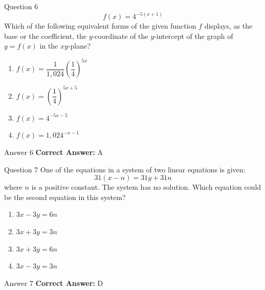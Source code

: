 \documentclass{beamer}
\begin{document}
\begin{frame}{Question 6}
\small
\[
f(x)=4^{-5(x+1)}
\]
Which of the following equivalent forms of the given function \(f\) displays, as the base or the coefficient, the \(y\)-coordinate of the \(y\)-intercept of the graph of \(y=f(x)\) in the \(xy\)-plane?
\vspace{0.35cm}
\begin{enumerate}
    \item[A.] $f(x)=\dfrac{1}{1{,}024}\left(\dfrac{1}{4}\right)^{5x}$
    \item[B.] $f(x)=\left(\dfrac{1}{4}\right)^{5x+5}$
    \item[C.] $f(x)=4^{-5x-5}$
    \item[D.] $f(x)=1{,}024^{-x-1}$
\end{enumerate}
\end{frame}
\begin{frame}{Answer 6}
\small
\textbf{Correct Answer:} A
\end{frame}

\begin{frame}{Question 7}
\small
One of the equations in a system of two linear equations is given:  
\[
31(x - n) = 31y + 31n
\]  
where \(n\) is a positive constant.  
The system has no solution. Which equation could be the second equation in this system?
\vspace{0.35cm}
\begin{enumerate}
    \item[A.] $3x - 3y = 6n$
    \item[B.] $3x + 3y = 3n$
    \item[C.] $3x + 3y = 6n$
    \item[D.] $3x - 3y = 3n$
\end{enumerate}
\end{frame}
\begin{frame}{Answer 7}
\small
\textbf{Correct Answer:} D
\end{frame}
\end{document}
